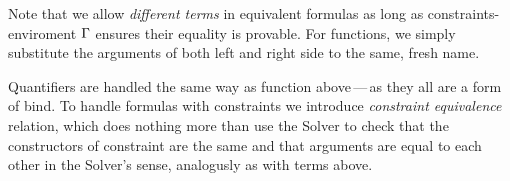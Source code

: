 \documentclass[english, mgr]{iithesis}
\renewcommand{\it}[1]{\textit{#1}}
\newcommand{\mdash}{\,---\,}
\def\-{{\mdash}}
\begin{document}
Note that we allow \it{different terms} in equivalent formulas as long as
constraints-enviroment $\Gamma$ ensures their equality is provable.
For functions, we simply substitute the arguments of both left and right side
to the same, fresh name.

Quantifiers are handled the same way as function above\-as they all are a form of bind.
To handle formulas with constraints we introduce \it{constraint equivalence} relation,
which does nothing more than use the Solver to check that the constructors
of constraint are the same and that arguments are equal to each other in the Solver's sense,
analogusly as with terms above.



\end{document}
